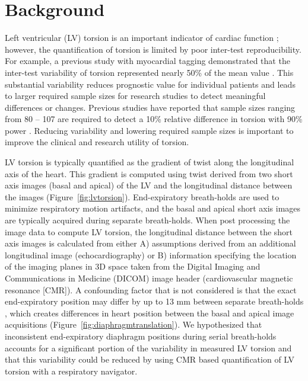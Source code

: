 \newpage

\section{Background}
	Left ventricular (LV) torsion is an important indicator of cardiac function \cite{Russel2011b,Gotte2006a}; however, the quantification of torsion is limited by poor inter-test reproducibility. For example, a previous study with myocardial tagging demonstrated that the inter-test variability of torsion represented nearly 50\% of the mean value \cite{Donekal2013a}. This substantial variability reduces prognostic value for individual patients and leads to larger required sample sizes for research studies to detect meaningful differences or changes. Previous studies have reported that sample sizes ranging from 80 – 107 are required to detect a 10\% relative difference in torsion with 90\% power \cite{Donekal2013a,Kowallick2016,Kaku2014a}. Reducing variability and lowering required sample sizes is important to improve the clinical and research utility of torsion.
	
	LV torsion is typically quantified as the gradient of twist along the longitudinal axis of the heart. This gradient is computed using twist derived from two short axis images (basal and apical) of the LV and the longitudinal distance between the images \cite{Donekal2013a} (Figure~\ref{fig:lvtorsion}). End-expiratory breath-holds are used to minimize respiratory motion artifacts, and the basal and apical short axis images are typically acquired during separate breath-holds. When post processing the image data to compute LV torsion, the longitudinal distance between the short axis images is calculated from either A) assumptions derived from an additional longitudinal image (echocardiography) or B) information specifying the location of the imaging planes in 3D space taken from the Digital Imaging and Communications in Medicine (DICOM) image header (cardiovascular magnetic resonance [CMR]). A confounding factor that is not considered is that the exact end-expiratory position may differ by up to 13 mm between separate breath-holds \cite{Liu1993,Wang1995a,Taylor1997a,Holland1998c,Fischer2006a}, which creates differences in heart position between the basal and apical image acquisitions (Figure~\ref{fig:diaphragmtranslation}). We hypothesized that inconsistent end-expiratory diaphragm positions during serial breath-holds accounts for a significant portion of the variability in measured LV torsion and that this variability could be reduced by using CMR based quantification of LV torsion with a respiratory navigator.
	
